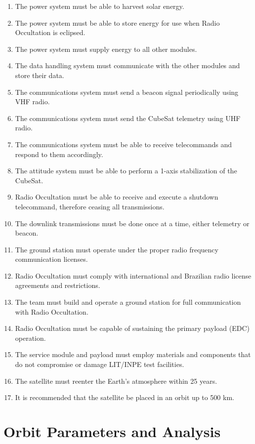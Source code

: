 \begin{enumerate}
    \item The power system must be able to harvest solar energy.
    \item The power system must be able to store energy for use when Radio Occultation is eclipsed.
    \item The power system must supply energy to all other modules.
    \item The data handling system must communicate with the other modules and store their data.
    \item The communications system must send a beacon signal periodically using VHF radio.
    \item The communications system must send the CubeSat telemetry using UHF radio.
    \item The communications system must be able to receive telecommands and respond to them accordingly.
    \item The attitude system must be able to perform a 1-axis stabilization of the CubeSat.
    \item Radio Occultation must be able to receive and execute a shutdown telecommand, therefore ceasing all transmissions.
    \item The downlink transmissions must be done once at a time, either telemetry or beacon.
    \item The ground station must operate under the proper radio frequency communication licenses.
    \item Radio Occultation must comply with international and Brazilian radio license agreements and restrictions.
    \item The team must build and operate a ground station for full communication with Radio Occultation.
    \item Radio Occultation must be capable of sustaining the primary payload (EDC) operation.
    \item The service module and payload must employ materials and components that do not compromise or damage LIT/INPE test facilities.
    \item The satellite must reenter the Earth's atmosphere within 25 years.
    \item It is recommended that the satellite be placed in an orbit up to 500 km.
\end{enumerate}


\section{Orbit Parameters and Analysis}

